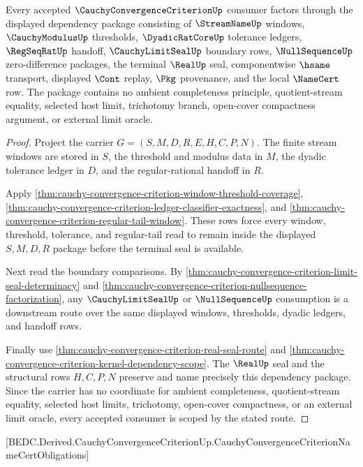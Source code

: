 \begin{theorem}
\label{thm:cauchy-convergence-criterion-scoped-dependency-package}
Every accepted $\CauchyConvergenceCriterionUp$ consumer factors through the displayed dependency package consisting of $\StreamNameUp$ windows, $\CauchyModulusUp$ thresholds, $\DyadicRatCoreUp$ tolerance ledgers, $\RegSeqRatUp$ handoff, $\CauchyLimitSealUp$ boundary rows, $\NullSequenceUp$ zero-difference packages, the terminal $\RealUp$ seal, componentwise $\hsame$ transport, displayed $\Cont$ replay, $\Pkg$ provenance, and the local $\NameCert$ row. The package contains no ambient completeness principle, quotient-stream equality, selected host limit, trichotomy branch, open-cover compactness argument, or external limit oracle.
\end{theorem}
\begin{proof}
Project the carrier $G=(S,M,D,R,E,H,C,P,N)$. The finite stream windows are stored in $S$, the threshold and modulus data in $M$, the dyadic tolerance ledger in $D$, and the regular-rational handoff in $R$.

Apply \autoref{thm:cauchy-convergence-criterion-window-threshold-coverage}, \autoref{thm:cauchy-convergence-criterion-ledger-classifier-exactness}, and \autoref{thm:cauchy-convergence-criterion-regular-tail-window}. These rows force every window, threshold, tolerance, and regular-tail read to remain inside the displayed $S,M,D,R$ package before the terminal seal is available.

Next read the boundary comparisons. By \autoref{thm:cauchy-convergence-criterion-limit-seal-determinacy} and \autoref{thm:cauchy-convergence-criterion-nullsequence-factorization}, any $\CauchyLimitSealUp$ or $\NullSequenceUp$ consumption is a downstream route over the same displayed windows, thresholds, dyadic ledgers, and handoff rows.

Finally use \autoref{thm:cauchy-convergence-criterion-real-seal-route} and \autoref{thm:cauchy-convergence-criterion-kernel-dependency-scope}. The $\RealUp$ seal and the structural rows $H,C,P,N$ preserve and name precisely this dependency package. Since the carrier has no coordinate for ambient completeness, quotient-stream equality, selected host limits, trichotomy, open-cover compactness, or an external limit oracle, every accepted consumer is scoped by the stated route.
\end{proof}

[BEDC.Derived.CauchyConvergenceCriterionUp.CauchyConvergenceCriterionNameCertObligations]

